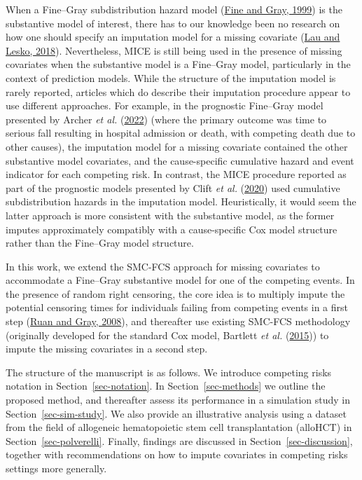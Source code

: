 \documentclass[
  letterpaper,
  DIV=11,
  numbers=noendperiod]{scrreprt}
\begin{document}
When a Fine--Gray subdistribution hazard model
(\protect\hyperlink{ref-fineProportionalHazardsModel1999}{Fine and Gray,
1999}) is the substantive model of interest, there has to our knowledge
been no research on how one should specify an imputation model for a
missing covariate
(\protect\hyperlink{ref-lauMissingnessSettingCompeting2018}{Lau and
Lesko, 2018}). Nevertheless, MICE is still being used in the presence of
missing covariates when the substantive model is a Fine--Gray model,
particularly in the context of prediction models. While the structure of
the imputation model is rarely reported, articles which do describe
their imputation procedure appear to use different approaches. For
example, in the prognostic Fine--Gray model presented by Archer \emph{et
al.}
(\protect\hyperlink{ref-archerDevelopmentExternalValidation2022}{2022})
(where the primary outcome was time to serious fall resulting in
hospital admission or death, with competing death due to other causes),
the imputation model for a missing covariate contained the other
substantive model covariates, and the cause-specific cumulative hazard
and event indicator for each competing risk. In contrast, the MICE
procedure reported as part of the prognostic models presented by Clift
\emph{et al.}
(\protect\hyperlink{ref-cliftLivingRiskPrediction2020}{2020}) used
cumulative subdistribution hazards in the imputation model.
Heuristically, it would seem the latter approach is more consistent with
the substantive model, as the former imputes approximately compatibly
with a cause-specific Cox model structure rather than the Fine--Gray
model structure.

In this work, we extend the SMC-FCS approach for missing covariates to
accommodate a Fine--Gray substantive model for one of the competing
events. In the presence of random right censoring, the core idea is to
multiply impute the potential censoring times for individuals failing
from competing events in a first step
(\protect\hyperlink{ref-ruanAnalysesCumulativeIncidence2008}{Ruan and
Gray, 2008}), and thereafter use existing SMC-FCS methodology
(originally developed for the standard Cox model, Bartlett \emph{et al.}
(\protect\hyperlink{ref-bartlettMultipleImputationCovariates2015}{2015}))
to impute the missing covariates in a second step.

The structure of the manuscript is as follows. We introduce competing
risks notation in Section~\ref{sec-notation}. In
Section~\ref{sec-methods} we outline the proposed method, and thereafter
assess its performance in a simulation study in
Section~\ref{sec-sim-study}. We also provide an illustrative analysis
using a dataset from the field of allogeneic hematopoietic stem cell
transplantation (alloHCT) in Section~\ref{sec-polverelli}. Finally,
findings are discussed in Section~\ref{sec-discussion}, together with
recommendations on how to impute covariates in competing risks settings
more generally.
\end{document}
